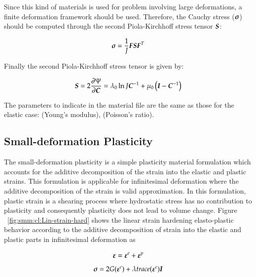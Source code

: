 Since this kind of materials is used for problem involving large deformations, a finite
deformation framework should be used. Therefore, the Cauchy stress ($\boldsymbol{\sigma}$) should
be computed through the second Piola-Kirchhoff stress tensor $\boldsymbol{S}$:

\begin{equation}
  \boldsymbol{\sigma } = \frac{1}{J}\boldsymbol{F}\boldsymbol{S}\boldsymbol{F}^T
\end{equation}

Finally the second Piola-Kirchhoff stress tensor is given by:

\begin{equation}
  \boldsymbol{S}  = 2\frac{\partial\Psi}{\partial\boldsymbol{C}} = \lambda_0\ln J 
\boldsymbol{C}^{-1}+\mu_0\left(\boldsymbol{I}-\boldsymbol{C}^{-1}\right)
\end{equation}

The parameters to indicate in the material file are the same
as those for the elastic case:  (Young's modulus),  (Poisson's
ratio).

\subsection{Small-deformation Plasticity}

The small-deformation plasticity is a simple plasticity material formulation which accounts for the additive decomposition of the strain into the elastic and plastic strains. This formulation is applicable for infinitesimal deformation where the additive decomposition of the strain is valid approximation. In this formulation, plastic strain is a shearing process where hydrostatic stress has no contribution to plasticity and consequently plasticity does not lead to
volume change. Figure ~\ref{fig:smm:cl:Lin-strain-hard} shows the linear strain hardening elasto-plastic behavior according to the additive decomposition of strain into the elastic and plastic parts in infinitesimal deformation as

\begin{equation} \label{eqn:smm:constitutive:strain decomposition}
	\boldsymbol{\varepsilon} = \boldsymbol{\varepsilon}^e +\boldsymbol{\varepsilon}^p
\end{equation}  
\begin{equation} \label{eqn:smm:constitutive:Hooks law}
	{\ensuremath{\boldsymbol{\sigma}}} = 2G(\boldsymbol{\varepsilon}^e) + \lambda  trace(\boldsymbol{\varepsilon}^e)\boldsymbol{I}
\end{equation}

